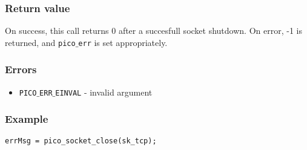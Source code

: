 \subsubsection*{Return value}
On success, this call returns 0 after a succesfull socket shutdown.
On error, -1 is returned, and \texttt{pico$\_$err} is set appropriately.

\subsubsection*{Errors}
\begin{itemize}[noitemsep]
\item \texttt{PICO$\_$ERR$\_$EINVAL} - invalid argument
\end{itemize}

\subsubsection*{Example}
\begin{verbatim}
errMsg = pico_socket_close(sk_tcp);
\end{verbatim}
